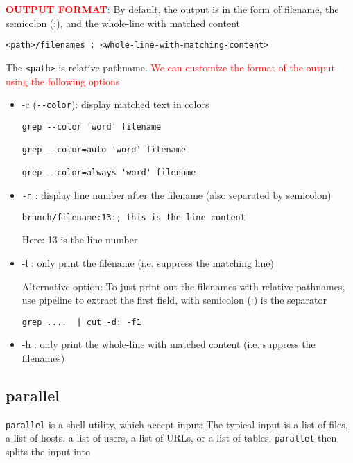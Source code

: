 \textcolor{red}{\bf OUTPUT FORMAT}:
By default, the output is in the form of filename, the semicolon (:), and the
whole-line with matched content
\begin{verbatim}
<path>/filenames : <whole-line-with-matching-content>
\end{verbatim}
The \verb!<path>! is relative pathname.
\textcolor{red}{We can customize the format of the output using the following
options}
\begin{itemize}
  \item -c (\verb!--color!): display matched text in colors
{\tiny
\begin{verbatim}
grep --color 'word' filename

grep --color=auto 'word' filename

grep --color=always 'word' filename
\end{verbatim}
}
  \item \verb!-n! : display line number after the filename (also separated by
  semicolon)

\begin{verbatim}
branch/filename:13:; this is the line content
\end{verbatim}
Here: 13 is the line number

  \item -l  : only print the filename (i.e. suppress the
  matching line)
    
Alternative option: To just print out the filenames with relative pathnames, use
pipeline to extract the first field, with semicolon (:) is the separator
\begin{verbatim} 
grep ....  | cut -d: -f1
\end{verbatim}  

  \item -h : only print the whole-line with matched content (i.e. suppress the
  filenames)
  
  \end{itemize}



\subsection{parallel}
\label{sec:parallel}

\verb!parallel! is a shell utility, which accept input: The typical input is a
list of files, a list of hosts, a list of users, a list of URLs, or a list of
tables. \verb!parallel! then splits the input into 
    
